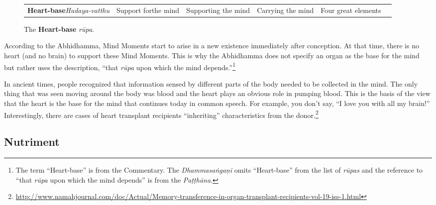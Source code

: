 \begin{figure} [H]
\setlength{\tabcolsep}{0pt}
\renewcommand{\arraystretch}{1.1}
\noindent\begin{tabular}{P{0.25\textwidth} | C{.185\textwidth} C{0.185\textwidth} C{0.185\textwidth} C{0.195\textwidth} m{0mm}}
\toprule
 &  &  &  & \\
\midrule
\textbf{Heart-base}\newline \textit{Hadaya-vatthu} & Support for\newline the mind & Supporting the mind & Carrying the mind & Four great elements &\\[9mm]
\bottomrule
\end{tabular} 
\caption[]{The \textbf{Heart-base} \textit{rūpa}.\footnotemark}
\end{figure}


According to the Abhidhamma, Mind Moments start to arise in a new existence immediately after conception. At that time, there is no heart (and no brain) to support these Mind Moments. This is why the Abhidhamma does not specify an organ as the base for the mind but rather uses the description, “that \textit{rūpa} upon which the mind depends.”\footnote{The term “Heart-base” is from the Commentary. The \textit{Dhammasaṅgaṇī} omits “Heart-base” from the list of \textit{rūpas} and the reference to “that \textit{rūpa} upon which the mind depends” is from the \textit{Paṭṭhāna}.}

In ancient times, people recognized that information sensed by different parts of the body needed to be collected in the mind. The only thing that was seen moving around the body was blood and the heart plays an obvious role in pumping blood. This is the basis of the view that the heart is the base for the mind that continues today in common speech. For example, you don’t say, “I love you with all my brain!” Interestingly, there are cases of heart transplant recipients “inheriting” characteristics from the donor.\footnote{\url{http://www.namahjournal.com/doc/Actual/Memory-transference-in-organ-transplant-recipients-vol-19-iss-1.html}}

\subsection*{Nutriment}


